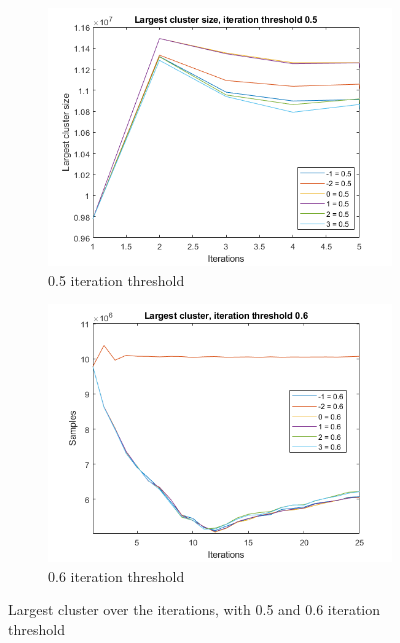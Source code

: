 \begin{figure}
    \centering
    \begin{subfigure}[b]{.49\textwidth}
        \centering
        \includegraphics[width=\textwidth]{figures/largest-0.5.png}
        \caption{0.5 iteration threshold}
        \label{sfig:iter:largestcluster0.5}
    \end{subfigure}
    \hfill
    \begin{subfigure}[b]{.49\textwidth}
        \centering
        \includegraphics[width=\textwidth]{figures/largest-0.6.png}
        \caption{0.6 iteration threshold}
        \label{sfig:iter:largestcluster0.6}
    \end{subfigure}
    \caption{Largest cluster over the iterations, with 0.5 and 0.6 iteration threshold}
    \label{fig:iter:largestcluster0.50.6}
\end{figure}

